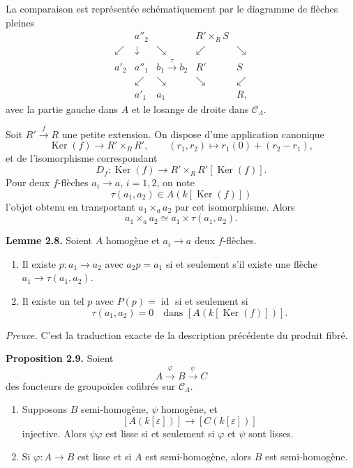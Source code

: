 \documentclass[11pt]{article}
\providecommand{\Ker}{\operatorname{Ker}}
\begin{document}
La comparaison est repr\'esent\'ee sch\'ematiquement par le diagramme de fl\`eches pleines
\[
\begin{array}{ccccc}
 & a''_2 & & R'\times_R S &\\
 \swarrow & \downarrow & \searrow & \swarrow & \searrow\\
a'_2 & a''_1 & b_1 \xrightarrow{\tau} b_2 & R' & S\\
 & \swarrow & \searrow & \searrow & \swarrow\\
 & a'_1 & a_1 & & R ,
\end{array}
\]
avec la partie gauche dans \(A\) et le losange de droite dans \(\mathcal C_\Lambda\).


Soit \(R'\xrightarrow f R\) une petite extension. On dispose d'une application canonique
\[
 \Ker(f)\longrightarrow R'\times_R R',
\qquad
(r_1,r_2)\longmapsto r_1(0)+(r_2-r_1),
\]
et de l'isomorphisme correspondant
\[
D_f:\Ker(f)\longrightarrow R'\times_R R'[\Ker(f)].
\]
Pour deux \(f\)-fl\`eches \(a_i\to a\), \(i=1,2\), on note
\[
 \tau(a_1,a_2)\in A(k[\Ker(f)])
\]
l'objet obtenu en transportant \(a_1\times_a a_2\) par cet isomorphisme. Alors
\[
 a_1\times_a a_2\simeq a_1\times\tau(a_1,a_2).
\]

\textbf{Lemme 2.8.} Soient \(A\) homog\`ene et \(a_i\to a\) deux \(f\)-fl\`eches.
\begin{enumerate}[label=(\arabic*)]
\item Il existe \(p:a_1\to a_2\) avec \(a_2p=a_1\) si et seulement s'il existe une fl\`eche
\(a_1\to\tau(a_1,a_2)\).
\item Il existe un tel \(p\) avec \(P(p)=\operatorname{id}\) si et seulement si
\[
 \tau(a_1,a_2)=0\quad\text{dans }[A(k[\Ker(f)])].
\]
\end{enumerate}

\emph{Preuve.} C'est la traduction exacte de la description pr\'ec\'edente du produit fibr\'e.

\textbf{Proposition 2.9.} Soient
\[
 A\xrightarrow{\varphi}B\xrightarrow{\psi}C
\]
des foncteurs de groupo\"ides cofibr\'es sur \(\mathcal C_\Lambda\).
\begin{enumerate}[label=(\alph*)]
\item Supposons \(B\) semi-homog\`ene, \(\psi\) homog\`ene, et
\[
 [A(k[\varepsilon])]\longrightarrow [C(k[\varepsilon])]
\]
injective. Alors \(\psi\varphi\) est lisse si et seulement si \(\varphi\) et \(\psi\) sont lisses.
\item Si \(\varphi:A\to B\) est lisse et si \(A\) est semi-homog\`ene, alors \(B\) est
semi-homog\`ene.
\end{enumerate}
\end{document}
